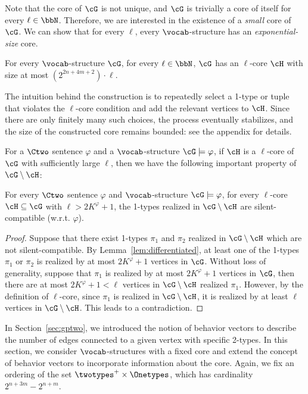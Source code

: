 Note that the core of $\cG$ is not unique,
and $\cG$ is trivially a core of itself for every $\ell \in \bbN$.
Therefore, we are interested in the existence of a \emph{small} core of $\cG$.
We can show that for every $\ell$, every $\vocab$-structure has an \emph{exponential-size} core.

\begin{lemma}\label{lem:small_core}
    For every $\vocab$-structure $\cG$, for every $\ell \in \bbN$,
    $\cG$ has an $\ell$-core $\cH$ with size at most $(2^{2n+4m+2}) \cdot \ell$.
\end{lemma}

The intuition behind the construction is to repeatedly select a 1-type or tuple that violates the $\ell$-core condition
and add the relevant vertices to $\cH$.
Since there are only finitely many such choices, the process eventually stabilizes,
and the size of the constructed core remains bounded: see the appendix for details.
 
For a $\Ctwo$ sentence $\varphi$ and a $\vocab$-structure $\cG \models \varphi$,
if $\cH$ is a $\ell$-core of $\cG$ with sufficiently large $\ell$,
then we have the following important property of $\cG \setminus \cH$:

\begin{lemma}\label{lem:mutually_null_compatible}
    For every $\Ctwo$ sentence $\varphi$ and $\vocab$-structure $\cG \models \varphi$,
    for every $\ell$-core $\cH \subseteq \cG$ with $\ell > 2K^\varphi + 1$, 
    the 1-types realized in $\cG \setminus \cH$ are silent-compatible (w.r.t. $\varphi$).
\end{lemma}

\begin{proof}
    Suppose that there exist 1-types $\pi_1$ and $\pi_2$ realized in $\cG \setminus \cH$
    which are not  silent-compatible.
    By Lemma~\ref{lem:differentiated},
    at least one of the 1-types $\pi_1$ or $\pi_2$ is realized by at most $2K^\varphi+1$ vertices in $\cG$.
    Without loss of generality,
    suppose that $\pi_1$ is realized by at most $2K^\varphi+1$ vertices in $\cG$,
    then there are at most $2K^\varphi+1 < \ell$ vertices in $\cG \setminus \cH$ realized $\pi_1$.
    However, by the definition of $\ell$-core, since $\pi_1$ is realized in $\cG \setminus \cH$,
    it is realized by at least $\ell$ vertices in $\cG \setminus \cH$.
    This leads to a contradiction.
\end{proof}

In Section~\ref{sec:gptwo}, we introduced the notion of behavior vectors to describe the number of edges connected to a given vertex with specific 2-types.
In this section, we consider $\vocab$-structures with a fixed core and extend the concept of behavior vectors to incorporate information about the core.
Again, we fix an ordering of the set $\twotypes^+ \times \Onetypes$,
which has cardinality $2^{n+3m}-2^{n+m}$.

